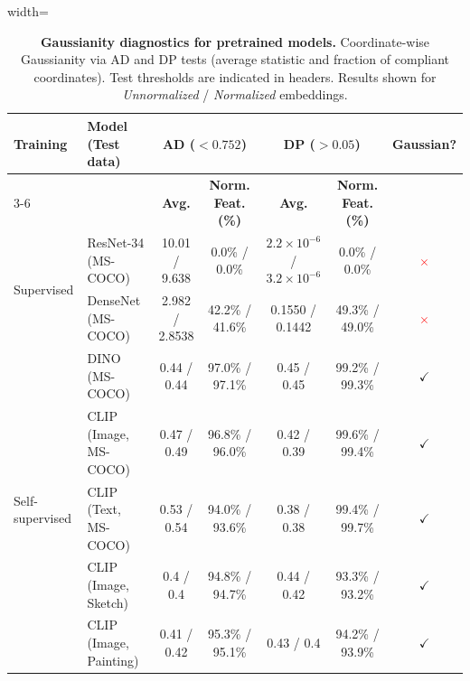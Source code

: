 \documentclass{article}
\begin{document}
\begin{table}[htb]
\centering
\caption{\textbf{Gaussianity diagnostics for pretrained models.}
Coordinate-wise Gaussianity via AD and DP tests (average statistic and fraction of compliant coordinates).
Test thresholds are indicated in headers.
Results shown for \textit{Unnormalized} / \textit{Normalized} embeddings.}
\label{table:gaussian_pretrained}

\setlength{\tabcolsep}{6pt}
\renewcommand{\arraystretch}{1.1}

\begin{adjustbox}{width=\linewidth}
\begin{tabular}{|l|l||cc||cc|c|}
\hline
\multirow{2}{*}{\textbf{Training}} 
& \multirow{2}{*}{\textbf{Model (Test data)}} 
& \multicolumn{2}{c||}{\textbf{AD ($<0.752$)}} 
& \multicolumn{2}{c|}{\textbf{DP ($>0.05$)}} 
& \multirow{2}{*}{\textbf{Gaussian?}} \\
\cline{3-6}

& 
& \textbf{Avg.} & \textbf{Norm. Feat. (\%)} 
& \textbf{Avg.} & \textbf{Norm. Feat. (\%)} & \\
\hline\hline

\multirow{2}{*}{Supervised}
& ResNet-34 (MS-COCO)         & 10.01 / 9.638 & 0.0\% / 0.0\% & $2.2\!\times\!10^{-6}$ / $3.2\!\times\!10^{-6}$ & 0.0\% / 0.0\% & \textcolor{red}{$\times$} \\
& DenseNet (MS-COCO)          & 2.982 / 2.8538 & 42.2\% / 41.6\% & 0.1550 / 0.1442 & 49.3\% / 49.0\% & \textcolor{red}{$\times$} \\
\hline

\multirow{5}{*}{Self-supervised}
& DINO (MS-COCO)              & 0.44 / 0.44 & 97.0\% / 97.1\% & 0.45 / 0.45 & 99.2\% / 99.3\% & \textcolor{green!60!black}{$\checkmark$}\\
& CLIP (Image, MS-COCO)        & 0.47 / 0.49 & 96.8\% / 96.0\% & 0.42 / 0.39 & 99.6\% / 99.4\% & \textcolor{green!60!black}{$\checkmark$}\\
& CLIP (Text, MS-COCO)         & 0.53 / 0.54 & 94.0\% / 93.6\% & 0.38 / 0.38 & 99.4\% / 99.7\%   & \textcolor{green!60!black}{$\checkmark$}\\
& CLIP (Image, Sketch)    &  0.4 / 0.4  &  94.8\% / 94.7\% &  0.44 / 0.42 &  93.3\% / 93.2\% & \textcolor{green!60!black}{$\checkmark$}\\
& CLIP (Image, Painting)  &  0.41 / 0.42 &  95.3\% / 95.1\% &  0.43 / 0.4 &  94.2\% / 93.9\% & \textcolor{green!60!black}{$\checkmark$}\\

\hline

\end{tabular}
\end{adjustbox}
\end{table}
\end{document}

